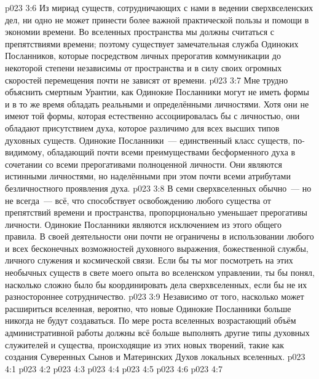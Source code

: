 \vs p023 3:6 Из мириад существ, сотрудничающих с нами в ведении сверхвселенских дел, ни одно не может принести более важной практической пользы и помощи в экономии времени. Во вселенных пространства мы должны считаться с препятствиями времени; поэтому существует замечательная служба Одиноких Посланников, которые посредством личных прерогатив коммуникации до некоторой степени независимы от пространства и в силу своих огромных скоростей перемещения почти не зависят от времени.
\vs p023 3:7 \pc Мне трудно объяснить смертным Урантии, как Одинокие Посланники могут не иметь формы и в то же время обладать реальными и определёнными личностями. Хотя они не имеют той формы, которая естественно ассоциировалась бы с личностью, они обладают присутствием духа, которое различимо для всех высших типов духовных существ. Одинокие Посланники~--- единственный класс существ, по\hyp{}видимому, обладающий почти всеми преимуществами бесформенного духа в сочетании со всеми прерогативами полноценной личности. Они являются истинными личностями, но наделёнными при этом почти всеми атрибутами безличностного проявления духа.
\vs p023 3:8 В семи сверхвселенных обычно~--- но не всегда~--- всё, что способствует освобождению любого существа от препятствий времени и пространства, пропорционально уменьшает прерогативы личности. Одинокие Посланники являются исключением из этого общего правила. В своей деятельности они почти не ограничены в использовании любого и всех бесконечных возможностей духовного выражения, божественной службы, личного служения и космической связи. Если бы ты мог посмотреть на этих необычных существ в свете моего опыта во вселенском управлении, ты бы понял, насколько сложно было бы координировать дела сверхвселенных, если бы не их разностороннее сотрудничество.
\vs p023 3:9 Независимо от того, насколько может расшириться вселенная, вероятно, что новые Одинокие Посланники больше никогда не будут создаваться. По мере роста вселенных возрастающий объём административной работы должны всё больше выполнять другие типы духовных служителей и существа, происходящие из этих новых творений, такие как создания Суверенных Сынов и Материнских Духов локальных вселенных.
\vs p023 4:1 
\vs p023 4:2 
\vs p023 4:3 \pc 
\vs p023 4:4 
\vs p023 4:5 \pc 
\vs p023 4:6 
\vsetoff
\vs p023 4:7 
\quizlink
